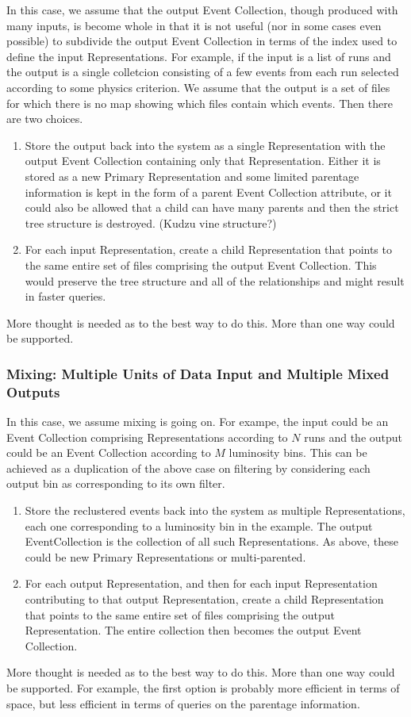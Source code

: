 \documentclass{cmspaper}
\begin{document}
In this case, we assume that the output Event Collection, though produced with
many inputs, is become whole in that it is not useful (nor in some cases 
even possible) to subdivide the output Event Collection in terms of the 
index used to define the input Representations.  For example, if the input is 
a list of runs and the  output is a single colletcion consisting of a few 
events from each run selected according  to some physics criterion. We 
assume that the output is a set of files for which there is no map
showing which files contain which events.  Then there are two choices.
\begin{enumerate}
\item Store the output back into the system as a single Representation with 
the output Event Collection containing only that Representation.  Either it 
is stored as a new Primary Representation and some limited parentage information 
is kept in the form of a parent Event Collection attribute,  or it 
could also be allowed that a child can have many parents and then the strict 
tree structure is destroyed.  (Kudzu vine structure?) 
\item For each input Representation, create a child Representation that points 
to the same entire set of files comprising the output Event Collection.  This
would preserve the tree structure and all of the relationships and might 
result in faster queries.  
\end{enumerate}
More thought is needed as to the best way to do this.  More than one way could be 
supported.  

\subsubsection{Mixing: Multiple Units of Data Input and Multiple Mixed Outputs}

In this case, we assume mixing is going on.  For exampe, the input could be 
an Event Collection comprising Representations according to $N$ runs and the 
output could be an Event Collection according to $M$ luminosity bins.  This 
can be achieved as a duplication of the above case on filtering by 
considering each output bin as corresponding to its own filter.  
\begin{enumerate}
\item Store the reclustered events back into the system as multiple 
Representations, each one corresponding to a luminosity bin in the example. 
The output EventCollection is the collection of all such Representations.
As above, these could be new Primary Representations or multi-parented.
\item For each output Representation, and then for each input Representation
contributing to that output Representation, create a child Representation 
that points to the same entire set of files comprising the output Representation.
The entire collection then becomes the output Event Collection.  
\end{enumerate}
More thought is needed as to the best way to do this.  More than one way could be 
supported.  For example, the first option is probably more efficient in terms of 
space, but less efficient in terms of queries on the parentage information.
\end{document}
